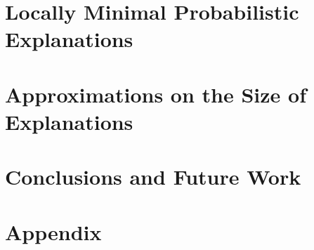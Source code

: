 \documentclass[11pt, letterpaper]{article}
\begin{document}
\section{Locally Minimal Probabilistic Explanations}
\label{sec-loc-min}


\section{Approximations on the Size of Explanations}
\label{sec-size-approx}


\section{Conclusions and Future Work}
\label{sec-conclusions}






\newpage
\onecolumn
\appendix
\section*{Appendix}

\end{document}
